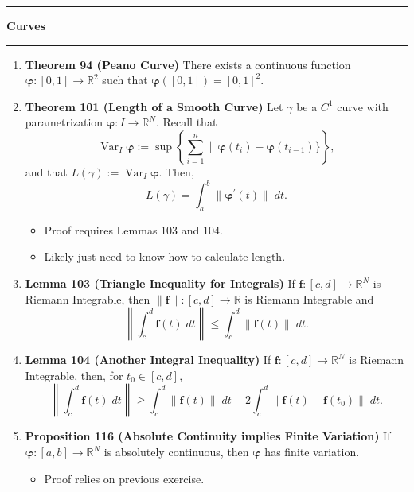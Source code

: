 \documentclass[11pt]{article}
\newcommand{\bvarphi}{\boldsymbol{\varphi}}
\newcommand{\Var}{\operatorname{Var}}
\begin{document}
\hrule
{\Large \bf Curves}
\vspace{1mm}
\hrule
\begin{enumerate}
\item \textbf{Theorem 94 (Peano Curve)} There exists a continuous function
$\bvarphi: [0,1] \rightarrow \mathbb{R}^2$ such that
$\bvarphi([0,1]) = [0,1]^2$.


\item \textbf{Theorem 101 (Length of a Smooth Curve)} Let $\gamma$ be a $C^1$
curve with parametrization $\bvarphi: I \rightarrow \mathbb{R}^N$. Recall
that
\[\Var_I \bvarphi
 := \sup \left\{
           \sum_{i = 1}^n \|\bvarphi(t_i) - \bvarphi(t_{i - 1})\}
         \right\}
,\]
and that $L(\gamma) := \Var_I \bvarphi$. Then,
\[L(\gamma) = \int_a^b \|\bvarphi^{\prime}(t)\|\; dt.\]
\begin{itemize}
\item Proof requires Lemmas 103 and 104.
\item Likely just need to know how to calculate length.
\end{itemize}

\item \textbf{Lemma 103 (Triangle Inequality for Integrals)} If
$\mathbf{f}: [c,d] \rightarrow \mathbb{R}^N$ is Riemann Integrable, then
$\|\mathbf{f}\|: [c,d] \rightarrow \mathbb{R}$ is Riemann Integrable and
\[\left\|\int_c^d \mathbf{f}(t) \; dt\right\|
                                      \leq \int_c^d \|\mathbf{f}(t)\| \; dt.\]

\item \textbf{Lemma 104 (Another Integral Inequality)} If
$\mathbf{f}: [c,d] \rightarrow \mathbb{R}^N$ is Riemann Integrable, then, for
$t_0 \in [c,d]$, 
\[\left\|\int_c^d \mathbf{f}(t) \; dt\right\|
  \geq \int_c^d \|\mathbf{f}(t)\| \; dt - 2\int_c^d\|\mathbf{f}(t)
  - \mathbf{f}(t_0)\| \; dt
.\]

\item \textbf{Proposition 116 (Absolute Continuity implies Finite Variation)}
If $\bvarphi: [a,b] \rightarrow \mathbb{R}^N$ is absolutely continuous, then
$\bvarphi$ has finite variation.

\begin{itemize}
\item Proof relies on previous exercise.
\end{itemize}


\end{enumerate}
\end{document}
